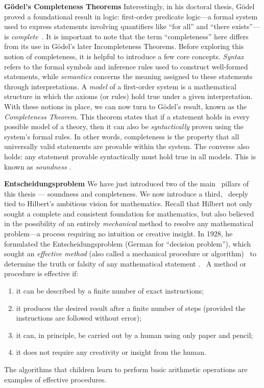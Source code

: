 \noindent \textbf{ Gödel’s Completeness Theorems} 
Interestingly, in his doctoral thesis, Gödel proved a foundational result in logic: first-order predicate logic---a formal system used to express statements involving quantifiers like ``for all'' and ``there exists''---is \emph{complete}~\cite{godelVollstandigkeitAxiomeLogischen1930}. It is important to note that the term ``completeness'' here differs from its use in Gödel’s later Incompleteness Theorems.
Before exploring this notion of completeness, it is helpful to introduce a few core concepts. \emph{Syntax} refers to the formal symbols and inference rules used to construct well-formed statements, while \emph{semantics} concerns the meaning assigned to these statements through interpretations. A \emph{model} of a first-order system is a mathematical structure in which the axioms (or rules) hold true under a given interpretation.
With these notions in place, we can now turn to Gödel’s result, known as the \emph{Completeness Theorem}. This theorem states that  if a statement holds in every possible model of a theory, then it can also be \emph{syntactically} proven using the system’s formal rules. In other words, completeness is the property that all universally valid statements are provable within the system.  The converse also holds: any statement provable syntactically must hold true in all models. This is known as \emph{soundness} \cite{franzenGodelsTheorem2008}.
 


\noindent \textbf{Entscheidungsproblem}
We have just introduced two of the main  pillars of this thesis ---
soundness and completeness. We now introduce a third,  deeply tied to Hilbert's ambitious vision for mathematics. Recall that Hilbert not only sought a complete and consistent foundation for mathematics, but also believed in the possibility of an entirely \emph{mechanical} method to resolve any mathematical problem---a process requiring no intuition or creative insight. In 1928, he formulated the Entscheidungsproblem (German for “decision problem”), which sought an \emph{effective method} (also called a mechanical procedure or algorithm)  to determine the truth or falsity of any mathematical statement \cite{hilbert1928}.  A method or procedure is effective if:
\begin{enumerate}
\item it can be described by a finite number of exact instructions;
\item it produces the desired result after a finite number of steps (provided the instructions are followed without error);
\item it can, in principle, be carried out by a human using only paper and pencil;
\item it does not require any creativity or insight from the human.
\end{enumerate}
The algorithms that children learn to perform basic arithmetic operations are examples of effective procedures. 

